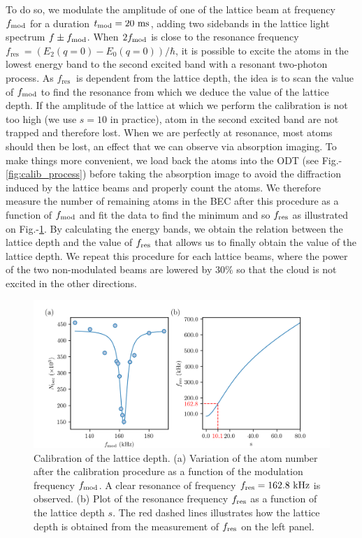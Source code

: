 To do so, we modulate the amplitude of one of the lattice beam at frequency $f_{\rm{mod}}$ for a duration $t_{\rm{mod} }= 20 \ \rm{ms}$, adding two sidebands in the lattice light spectrum $f \pm f_{\rm{mod}}$. When $2 f_{\rm{mod}}$ is close to the resonance frequency $f_{\text {res }}=\left(E_{2}(q=0)-E_{0}(q=0)\right)/\hbar$, it is possible to excite the atoms in the lowest energy band to the second excited band with a resonant two-photon process. As $f_{\text {res }}$ is dependent from the lattice depth, the idea is to scan the value of $f_{\rm{mod}}$ to find the resonance from which we deduce the value of the lattice depth. If the amplitude of the lattice at which we perform the calibration is not too high (we use $s= 10$ in practice), atom in the second excited band are not trapped and therefore lost. When we are perfectly at resonance, most atoms should then be lost, an effect that we can observe via absorption imaging. To make things more convenient, we load back the atoms into the ODT (see Fig.-\ref{fig:calib_process}) before taking the absorption image to avoid the diffraction induced by the lattice beams and properly count the atoms. We therefore measure the number of remaining atoms in the BEC after this procedure as a function of $f_{\rm{mod}}$ and fit the data to find the minimum and so $f_{\rm{res}}$ as illustrated on Fig.-\ref{fig:lattice_calibration}. By calculating the energy bands, we obtain the relation between the lattice depth and the value of $f_{\rm{res}}$ that allows us to finally obtain the value of the lattice depth. We repeat this procedure for each lattice beams, where the power of the two non-modulated beams are lowered by $30 \%$ so that the cloud is not excited in the other directions.

\begin{figure}
    \centering
    \includegraphics[width=\textwidth]{Fig/Chapter3/lattice_calibration.png}
    \caption[Calibration of the lattice depth]{Calibration of the lattice depth. (a) Variation of the atom number after the calibration procedure as a function of the modulation frequency $f_{\rm{mod}}$. A clear resonance of frequency $f_{\rm{res}}=162.8 \ \rm{kHz}$ is observed. (b) Plot of the resonance frequency $f_{\rm{res}}$ as a function of the lattice depth $s$. The red dashed lines illustrates how the lattice depth is obtained from the measurement of $f_{\rm{res}}$ on the left panel.}
    \label{fig:lattice_calibration}
\end{figure}


